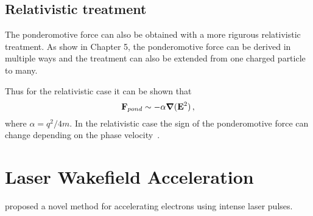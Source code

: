 \documentclass[12pt, class=report, crop=false]{standalone}
\begin{document}
\subsection{Relativistic treatment}

The ponderomotive force can also be obtained with a more rigurous relativistic
treatment. As \Textcite{mulser_highpower_2010} show in Chapter 5, the ponderomotive
force can be derived in multiple ways and the treatment can also be extended from
one charged particle to many.

Thus for the relativistic case it can be shown that
\[
\vb{F}_{pond} \sim -\alpha \grad{(\vb{E}^2)}\,,
\]
where \(\alpha=q^2/4m\). In the relativistic case the sign of the ponderomotive
force can change depending on the phase velocity~\autocite[205]{mulser_highpower_2010}.

\section{Laser Wakefield Acceleration}

\Textcite{tajima_laserelectron_1979} proposed a novel method for accelerating
electrons using intense laser pulses.
\end{document}
